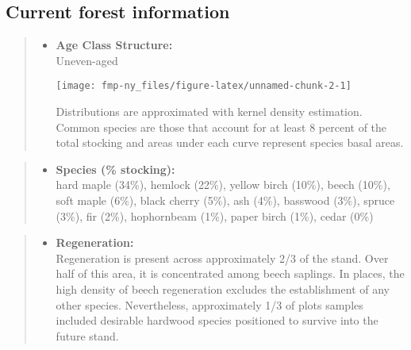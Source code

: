 \documentclass[]{tufte-handout}
\providecommand{\tightlist}{%
  \setlength{\itemsep}{0pt}\setlength{\parskip}{0pt}}
\begin{document}
\subsection{Current forest
information}\label{current-forest-information}

\begin{quote}
\begin{itemize}
\tightlist
\item
  \textbf{Age Class Structure:}\\
  \vspace{2pt} Uneven-aged\\

  \begin{marginfigure}
  \texttt{[image: fmp-ny\_files/figure-latex/unnamed-chunk-2-1]} \caption[Distributions are approximated with kernel density estimation]{Distributions are approximated with kernel density estimation. Common species are those that account for at least 8 percent of the total stocking and areas under each curve represent species basal areas.}\label{fig:unnamed-chunk-2}
  \end{marginfigure}
\end{itemize}
\end{quote}

\begin{quote}
\begin{itemize}
\tightlist
\item
  \textbf{Species (\% stocking):}\\
  \vspace{2pt} hard maple (34\%), hemlock (22\%), yellow birch (10\%),
  beech (10\%), soft maple (6\%), black cherry (5\%), ash (4\%),
  basswood (3\%), spruce (3\%), fir (2\%), hophornbeam (1\%), paper
  birch (1\%), cedar (0\%)
\end{itemize}
\end{quote}

\begin{quote}
\begin{itemize}
\tightlist
\item
  \textbf{Regeneration:}\\
  \vspace{2pt} Regeneration is present across approximately 2/3 of the
  stand. Over half of this area, it is concentrated among beech
  saplings. In places, the high density of beech regeneration excludes
  the establishment of any other species. Nevertheless, approximately
  1/3 of plots samples included desirable hardwood species positioned to
  survive into the future stand.
\end{itemize}
\end{quote}
\end{document}
